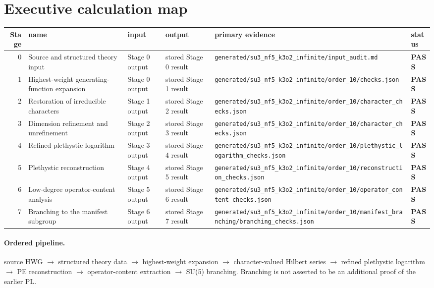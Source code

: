 \documentclass[11pt]{article}
\newcommand{\Pass}{\textcolor{green!50!black}{\textbf{PASS}}}
\newcommand{\RawPath}[1]{\texttt{#1}}
\begin{document}
\section{Executive calculation map}
\begin{longtable}{r p{2.4cm} p{2.2cm} p{2.2cm} p{3.1cm} l}
\toprule Stage & name & input & output & primary evidence & status\\\midrule\endhead
0 & Source and structured theory input & Stage 0 output & stored Stage 0 result & \RawPath{generated/su3\_nf5\_k3o2\_infinite/input\_audit.md} & \Pass\\
1 & Highest-weight generating-function expansion & Stage 0 output & stored Stage 1 result & \RawPath{generated/su3\_nf5\_k3o2\_infinite/order\_10/checks.json} & \Pass\\
2 & Restoration of irreducible characters & Stage 1 output & stored Stage 2 result & \RawPath{generated/su3\_nf5\_k3o2\_infinite/order\_10/character\_checks.json} & \Pass\\
3 & Dimension refinement and unrefinement & Stage 2 output & stored Stage 3 result & \RawPath{generated/su3\_nf5\_k3o2\_infinite/order\_10/character\_checks.json} & \Pass\\
4 & Refined plethystic logarithm & Stage 3 output & stored Stage 4 result & \RawPath{generated/su3\_nf5\_k3o2\_infinite/order\_10/plethystic\_logarithm\_checks.json} & \Pass\\
5 & Plethystic reconstruction & Stage 4 output & stored Stage 5 result & \RawPath{generated/su3\_nf5\_k3o2\_infinite/order\_10/reconstruction\_checks.json} & \Pass\\
6 & Low-degree operator-content analysis & Stage 5 output & stored Stage 6 result & \RawPath{generated/su3\_nf5\_k3o2\_infinite/order\_10/operator\_content\_checks.json} & \Pass\\
7 & Branching to the manifest subgroup & Stage 6 output & stored Stage 7 result & \RawPath{generated/su3\_nf5\_k3o2\_infinite/order\_10/manifest\_branching/branching\_checks.json} & \Pass\\
\bottomrule\end{longtable}
\paragraph{Ordered pipeline.} source HWG $\to$ structured theory data $\to$ highest-weight expansion $\to$ character-valued Hilbert series $\to$ refined plethystic logarithm $\to$ PE reconstruction $\to$ operator-content extraction $\to$ SU(5) branching. Branching is not asserted to be an additional proof of the earlier PL.
\end{document}
